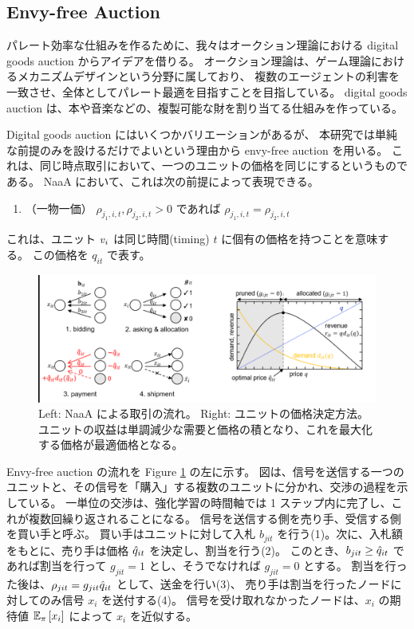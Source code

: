 \subsection{Envy-free Auction}
パレート効率な仕組みを作るために、我々はオークション理論における digital goods auction からアイデアを借りる。
オークション理論は、ゲーム理論におけるメカニズムデザインという分野に属しており、
複数のエージェントの利害を一致させ、全体としてパレート最適を目指すことを目指している。
digital goods auction は、本や音楽などの、複製可能な財を割り当てる仕組みを作っている。

Digital goods auction にはいくつかバリエーションがあるが、
本研究では単純な前提のみを設けるだけでよいという理由から envy-free auction \citep{guruswami2005profit} を用いる。
これは、同じ時点取引において、一つのユニットの価格を同じにするというものである。
NaaA において、これは次の前提によって表現できる。
\begin{enumerate}
\renewcommand{\labelenumi}{N\arabic{enumi}:}
\setcounter{enumi}{4}
\item （一物一価）
	$\rho_{j_1,i,t}, \rho_{j_2,i,t} > 0$ であれば $\rho_{j_1,i,t} = \rho_{j_2,i,t}$ 
\end{enumerate}
これは、ユニット $v_{i}$ は同じ時間(timing) $t$ に個有の価格を持つことを意味する。
この価格を $q_{it}$ で表す。

\begin{figure}[t]
\centering
\includegraphics[width=\linewidth]{img/double.eps}
\caption{
Left: NaaA による取引の流れ。
Right: ユニットの価格決定方法。ユニットの収益は単調減少な需要と価格の積となり、これを最大化する価格が最適価格となる。
}
\label{fig:double}
\end{figure}

Envy-free auction の流れを Figure \ref{fig:double} の左に示す。
図は、信号を送信する一つのユニットと、その信号を「購入」する複数のユニットに分かれ、交渉の過程を示している。
一単位の交渉は、強化学習の時間軸では 1 ステップ内に完了し、これが複数回繰り返されることになる。
信号を送信する側を売り手、受信する側を買い手と呼ぶ。
買い手はユニットに対して入札 $b_{jit}$ を行う(1)。次に、入札額をもとに、売り手は価格 ${\hat{q}}_{it}$ を決定し、割当を行う(2)。
このとき、$b_{jit} \ge {\hat{q}}_{it}$ であれば割当を行って $g_{jit} = 1$ とし、そうでなければ $g_{jit} = 0$ とする。
割当を行った後は、$\rho_{jit} = g_{jit} {\hat{q}}_{it}$ として、送金を行い(3)、
売り手は割当を行ったノードに対してのみ信号 $x_i$ を送付する(4)。
信号を受け取れなかったノードは、$x_i$ の期待値 $\mathbb{E}_{\pi}\left[ x_i \right]$ によって $x_i$ を近似する。

